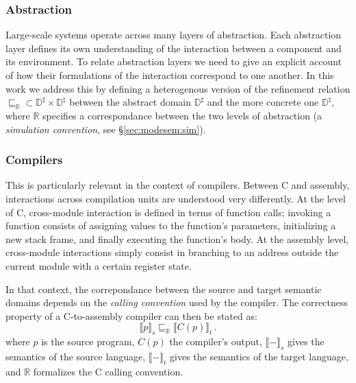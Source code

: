 \documentclass[sigplan,10pt,review,anonymous]{acmart}
\begin{document}

\subsubsection{Abstraction} %

Large-scale systems operate across many layers of abstraction.
Each abstraction layer defines its own understanding of the interaction
between a component and its environment.
To relate abstraction layers we need to give
an explicit account of how their formulations of the interaction
correspond to one another.
In this work we address this by defining a heterogenous version
of the refinement relation
${\sqsubseteq_\mathbb{R}} \subset
 \mathbb{D}^\sharp \times \mathbb{D}^\natural$ between
the abstract domain $\mathbb{D}^\sharp$ and
the more concrete one $\mathbb{D}^\natural$, where 
$\mathbb{R}$ specifies a correspondance between
the two levels of abstraction
(a \emph{simulation convention}, see \S\ref{sec:modesem:sim}).



\subsubsection{Compilers} %

This is particularly relevant
in the context of compilers.
Between C and assembly,
interactions across compilation units
are understood very differently.
At the level of C,
cross-module interaction is defined in terms of
function calls;
invoking a function consists of assigning values
to the function's parameters,
initializing a new stack frame,
and finally executing the function's body.
At the assembly level, cross-module
interactions simply consist in branching to an address
outside the current module with
a certain register state.

In that context,
the correpondance between the source and target semantic domains
depends on the \emph{calling convention} used by the compiler.
The correctness property of a C-to-assembly compiler
can then be stated as:
\[ \llbracket p \rrbracket_s \sqsubseteq_\mathbb{R}
   \llbracket C(p) \rrbracket_t \,. \]
where
$p$ is the source program, $C(p)$ the compiler's output,
$\llbracket - \rrbracket_s$ gives the semantics of the source language,
$\llbracket - \rrbracket_t$ gives the semantics of the target language,
and $\mathbb{R}$ formalizes the C calling convention.
\end{document}
